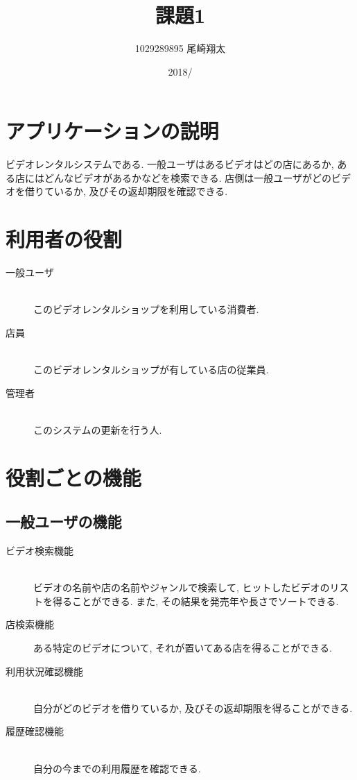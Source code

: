 \documentclass{jarticle}
\begin{document}
\title{課題1}
\author{1029289895 尾崎翔太}
\date{2018/}

\maketitle
\newpage

\section{アプリケーションの説明}
ビデオレンタルシステムである. 一般ユーザはあるビデオはどの店にあるか, ある店にはどんなビデオがあるかなどを検索できる. 店側は一般ユーザがどのビデオを借りているか, 及びその返却期限を確認できる.
\section{利用者の役割}
\begin{description}
\item[一般ユーザ] \\ \leavevmode
このビデオレンタルショップを利用している消費者.
\item[店員] \\ \leavevmode
このビデオレンタルショップが有している店の従業員.
\item[管理者] \\ \leavevmode
このシステムの更新を行う人.
\end{description}
\section{役割ごとの機能}
\subsection{一般ユーザの機能}
\begin{description}
\item[ビデオ検索機能] \\ \leavevmode
ビデオの名前や店の名前やジャンルで検索して, ヒットしたビデオのリストを得ることができる. また, その結果を発売年や長さでソートできる.
\item[店検索機能]
ある特定のビデオについて, それが置いてある店を得ることができる.
\item[利用状況確認機能] \\ \leavevmode
自分がどのビデオを借りているか, 及びその返却期限を得ることができる.
\item[履歴確認機能] \\ \leavevmode
自分の今までの利用履歴を確認できる.
\end{description}
\end{document}
